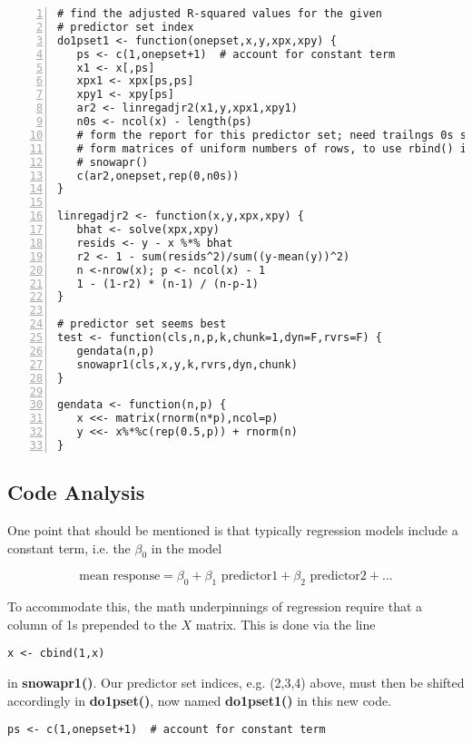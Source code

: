 \begin{lstlisting}[numbers=left]
# find the adjusted R-squared values for the given 
# predictor set index
do1pset1 <- function(onepset,x,y,xpx,xpy) {
   ps <- c(1,onepset+1)  # account for constant term
   x1 <- x[,ps]
   xpx1 <- xpx[ps,ps]
   xpy1 <- xpy[ps]
   ar2 <- linregadjr2(x1,y,xpx1,xpy1)
   n0s <- ncol(x) - length(ps)
   # form the report for this predictor set; need trailngs 0s so as to
   # form matrices of uniform numbers of rows, to use rbind() in
   # snowapr()
   c(ar2,onepset,rep(0,n0s))
}

linregadjr2 <- function(x,y,xpx,xpy) {
   bhat <- solve(xpx,xpy)
   resids <- y - x %*% bhat
   r2 <- 1 - sum(resids^2)/sum((y-mean(y))^2)
   n <-nrow(x); p <- ncol(x) - 1
   1 - (1-r2) * (n-1) / (n-p-1)
}

# predictor set seems best
test <- function(cls,n,p,k,chunk=1,dyn=F,rvrs=F) {
   gendata(n,p)
   snowapr1(cls,x,y,k,rvrs,dyn,chunk)
}

gendata <- function(n,p) {
   x <<- matrix(rnorm(n*p),ncol=p)
   y <<- x%*%c(rep(0.5,p)) + rnorm(n)
}

\end{lstlisting}

\subsection{Code Analysis}

One point that should be mentioned is that typically regression models
include a constant term, i.e. the $\beta_0$ in the model

\begin{equation}
\textrm{mean response} = \beta_0 + \beta_1 \textrm{ predictor1} +
\beta_2 \textrm{ predictor2} + ...
\end{equation}

To accommodate this, the math underpinnings of regression require that a
column of 1s prepended to the $X$ matrix.  This is done via the line

\begin{lstlisting}
x <- cbind(1,x)
\end{lstlisting}

in {\bf snowapr1()}.  Our predictor set indices, e.g. (2,3,4) above,
must then be shifted accordingly in {\bf do1pset()}, now named {\bf
do1pset1()} in this new code.  

\begin{lstlisting}
ps <- c(1,onepset+1)  # account for constant term
\end{lstlisting}

